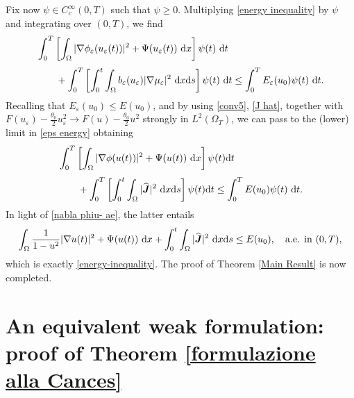 \documentclass[11pt,  reqno]{amsart}%
\theoremstyle{plain}
\theoremstyle{definition}
\theoremstyle{remark}
\numberwithin{equation}{section}
\newcommand{\ve}{\varepsilon}
\newcommand{\dx}{\textup{d}x}
\newcommand{\dt}{\textup{d}t}
\begin{document}
Fix now $\psi \in C_c^\infty(0,T)$ such that $\psi \geq 0$. Multiplying \eqref{energy inequality} by $\psi$ and integrating over $(0,T)$, we find
\begin{align} 
&\int_0^T  \left[ \int_\Omega  |\nabla \phi_\ve (u_\ve(t))|^2+  \Psi(u_\ve(t)) \ \dx\right] \psi(t) \ \dt \notag
\\[3pt]
&\qquad +  \int_0^T \left[ \int_0^t \int_{\Omega} b_{\ve}(u_{\ve})|\nabla \mu_{\ve}|^2 \ \dx \mathrm{d}s \right]  \psi (t) \ \dt 
 \le \int_0^T E_{\ve}(u_0) \psi(t) \ \dt.
\label{eps energy}
\end{align}
Recalling that $E_{\ve}(u_0) \leq E(u_0)$, and by using \eqref{conv5}, \eqref{J hat}, together with $F(u_\ve) -\frac{\theta_0}{2}u^2_\ve \to F(u) -\frac{\theta_0}{2}u^2$ strongly  in $L^2(\Omega_T)$, we can pass to the (lower) limit in \eqref{eps energy} obtaining
 \begin{align} 
&\int_0^T  \left[ \int_\Omega |\nabla \phi(u(t))|^2+ \Psi(u(t))  \ \dx\right] \psi(t) \dt
\notag
\\[3pt]
&\qquad 
+  \int_0^T \left[ \int_0^t \int_{\Omega} |\widehat{\boldsymbol{J}}|^2 \ \dx \mathrm{d}s \right]  \psi (t) \dt
 \le \int_0^T E(u_0) \psi(t) \ \dt.
\label{energy}
\end{align}
In light of \eqref{nabla phiu- ae}, the latter entails 
 \begin{align} 
\int_\Omega \frac{1}{1-u^2} |\nabla u(t)|^2 + \Psi(u(t))  \ \dx
 +  \int_0^t \int_{\Omega} |\widehat{\boldsymbol{J}}|^2 \ \dx \mathrm{d}s  \leq E(u_0), \quad \text{a.e. in } (0,T),
\label{energy-2}
\end{align} 
which is exactly \eqref{energy-inequality}.
The proof of Theorem \ref{Main Result} is now completed.


\section{An equivalent weak formulation: proof of Theorem \ref{formulazione alla Cances}} 

\end{document}
